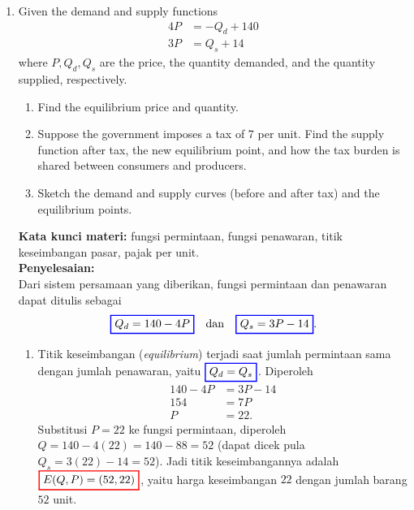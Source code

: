 \documentclass[10pt,openany,a4paper]{article}
\theoremstyle{definition}
\theoremstyle{definition}
\theoremstyle{plain}
\newenvironment{jawab}[2][tes]{%
\par\noindent\textbf{Kata kunci materi:} #1.\\
\textbf{Penyelesaian:} #2%
}{}
\begin{document}
\begin{enumerate}
    \item Given the demand and supply functions
    \begin{align*}
        4P &= -Q_d+140\\
        3P &= Q_s+14
    \end{align*}
    where $P,Q_d,Q_s$ are the price, the quantity demanded, and the quantity supplied, respectively.
    \begin{enumerate}
        \item Find the equilibrium price and quantity.
        \item Suppose the government imposes a tax of 7 per unit. Find the supply function after tax, the new equilibrium point, and how the tax burden is shared between consumers and producers.
        \item Sketch the demand and supply curves (before and after tax) and the equilibrium points.
    \end{enumerate}
    \begin{jawab}[fungsi permintaan, fungsi penawaran, titik keseimbangan pasar, pajak per unit]{~\\
        Dari sistem persamaan yang diberikan, fungsi permintaan dan penawaran dapat ditulis sebagai
        \begin{align*}
            \colorlet{oldcolor}{.}
        \color{blue}
        \setlength{\fboxrule}{1pt} \boxed{\color{oldcolor}Q_d = 140 - 4P}\color{oldcolor} \quad\text{dan}\quad \colorlet{oldcolor}{.}
        \color{blue}
        \setlength{\fboxrule}{1pt} \boxed{\color{oldcolor}Q_s = 3P - 14}\color{oldcolor}.
        \end{align*}
        \begin{enumerate}
            \item Titik keseimbangan (\textit{equilibrium}) terjadi saat jumlah permintaan sama dengan jumlah penawaran, yaitu $\colorlet{oldcolor}{.}
        \color{blue}
        \setlength{\fboxrule}{1pt} \boxed{\color{oldcolor}Q_d=Q_s}\color{oldcolor}$. Diperoleh
            \begin{align*}
                140 - 4P &= 3P - 14\\
                154 &= 7P\\
                P &= 22.
            \end{align*}
            Substitusi $P=22$ ke fungsi permintaan, diperoleh $Q = 140 - 4(22) = 140 - 88 = 52$ (dapat dicek pula $Q_s=3(22)-14=52$). Jadi titik keseimbangannya adalah $\colorlet{oldcolor}{.}
        \color{red}
        \setlength{\fboxrule}{1pt} \boxed{\color{oldcolor}E(Q,P)=(52,22)}\color{oldcolor}$, yaitu harga keseimbangan $22$ dengan jumlah barang $52$ unit.

\end{enumerate}}
\end{jawab}
\end{enumerate}
\end{document}
